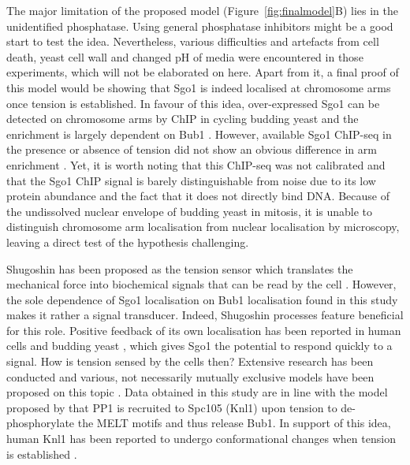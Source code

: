 The major limitation of the proposed model (Figure~\ref{fig:finalmodel}B) lies in the unidentified phosphatase. Using general phosphatase inhibitors might be a good start to test the idea. Nevertheless, various difficulties and artefacts from cell death, yeast cell wall and changed pH of media were encountered in those experiments, which will not be elaborated on here. Apart from it, a final proof of this model would be showing that Sgo1 is indeed localised at chromosome arms once tension is established. In favour of this idea, over-expressed Sgo1 can be detected on chromosome arms by ChIP in cycling budding yeast and the enrichment is largely dependent on Bub1 \citep{Clift2009}. However, available Sgo1 ChIP-seq in the presence or absence of tension did not show an obvious difference in arm enrichment \citep{Paldi2020ConvergentPericentromeres}. Yet, it is worth noting that this ChIP-seq was not calibrated and that the Sgo1 ChIP signal is barely distinguishable from noise due to its low protein abundance and the fact that it does not directly bind DNA. Because of the undissolved nuclear envelope of budding yeast in mitosis, it is unable to distinguish chromosome arm localisation from nuclear localisation by microscopy, leaving a direct test of the hypothesis challenging. 

Shugoshin has been proposed as the tension sensor which translates the mechanical force into biochemical signals that can be read by the cell \citep{Indjeian2005a, Nerusheva2014, Marston2015}. However, the sole dependence of Sgo1 localisation on Bub1 localisation found in this study makes it rather a signal transducer. Indeed, Shugoshin processes feature beneficial for this role. Positive feedback of its own localisation has been reported in human cells \citep{Liang2019ACells} and budding yeast \citep{Roy2019}, which gives Sgo1 the potential to respond quickly to a signal. How is tension sensed by the cells then? Extensive research has been conducted and various, not necessarily mutually exclusive models have been proposed on this topic \citep{Hindriksen2017TheLocalization, McVey2021AuroraSegregation, Broad2020AuroraCells}. Data obtained in this study are in line with the model proposed by \cite{Roy2019} that PP1 is recruited to Spc105 (Knl1) upon tension to de-phosphorylate the MELT motifs and thus release Bub1. In support of this idea, human Knl1 has been reported to undergo conformational changes when tension is established \citep{Roscioli2020}. 

